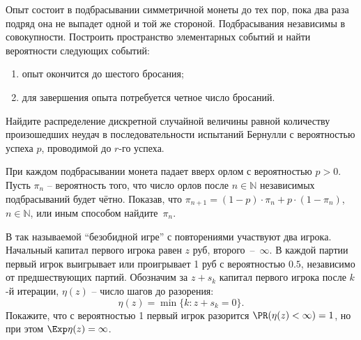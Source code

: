 

\begin{problem}
Опыт состоит в подбрасывании симметричной монеты до тех пор, пока два раза подряд она не выпадет одной и той же стороной. Подбрасывания независимы в совокупности. 
Построить пространство элементарных событий и найти вероятности следующих событий: 
\begin{enumerate}
\item опыт окончится до шестого бросания; 
\item для завершения опыта потребуется четное число бросаний. 
\end{enumerate}
\end{problem}

\begin{problem}
Найдите распределение дискретной случайной величины равной количеству произошедших неудач в последовательности испытаний Бернулли с вероятностью успеха $p$, проводимой до $r$-го успеха.

\end{problem}

\begin{problem}
При каждом подбрасывании монета падает вверх орлом с вероятностью $p>0$. Пусть $\pi _{n} $ -- вероятность того, что число орлов после $n\in {\mathbb N}$ независимых подбрасываний будет чётно. Показав, что $\pi _{n+1} =\left(1-p\right)\cdot \pi _{n} +p\cdot \left(1-\pi _{n} \right)$, $n\in {\mathbb N}$, или иным способом найдите~$\pi _{n} $. 
\end{problem}

\begin{comment}
\begin{problem}
Симметричную монету независимо бросили $n$ раз. Результат бросания записали в виде последовательности нулей и единиц. Покажите, что с вероятностью стремящейся к единице при $n\to \infty $ длина максимальной подпоследовательности из подряд идущих единиц лежит в промежутке
\[\left(\log \sqrt{n} ,\; \log n^{2} \right).\] 
\end{problem}
\end{comment}

\begin{problem}

В так называемой ``безобидной игре'' с повторениями участвуют два игрока. Начальный капитал первого игрока равен $z$ руб, второго~--~$\infty$. В каждой партии первый игрок выигрывает или проигрывает 1 руб с вероятностью $0.5$, независимо от предшествующих партий. Обозначим за $z + s_k$ капитал первого игрока после $k$-й итерации, $\eta(z)$ -- число шагов до разорения:
\[
\eta(z) = \min \{k: z + s_k = 0 \}.
\]     
Покажите, что с вероятностью 1 первый игрок разорится $\PR(\eta(z)<\infty) = 1$, но при этом $\Exp \eta(z) = \infty$.  

\end{problem}

